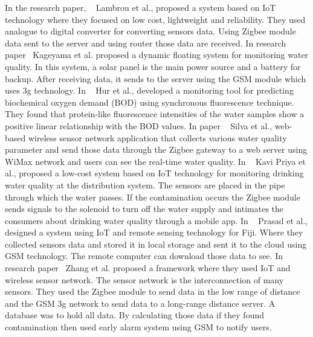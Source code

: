 In the research paper, ~\cite{lambrou2012low} Lambrou et al., proposed a system based on IoT technology where they focused on low cost, lightweight and reliability. They used analogue to digital converter for converting sensors data. Using Zigbee module data sent to the server and using router those data are received.
In research paper~\cite{kageyama2016wireless} Kageyama et al. proposed a dynamic floating system for monitoring water quality. In this system, a solar panel is the main power source and a battery for backup. After receiving data, it sends to the server using the GSM module which uses 3g technology. 
In ~\cite{hur2008using} Hur et al., developed a monitoring tool for predicting biochemical oxygen demand (BOD) using synchronous fluorescence technique. They found that protein-like fluorescence intensities of the water samples show a positive linear relationship with the BOD values.
In paper ~\cite{silva2011web} Silva et al., web-based wireless sensor network application that collects various water quality parameter and send those data through the Zigbee gateway to a web server using WiMax network and users can see the real-time water quality.
In ~\cite{priya2018design} Kavi Priya et al., proposed a low-cost system based on IoT technology for monitoring drinking water quality at the distribution system. The sensors are placed in the pipe through which the water passes. If the contamination occurs the Zigbee module sends signals to the solenoid to turn off the water supply and intimates the consumers about drinking water quality through a mobile app.
In ~\cite{prasad2015smart} Prasad et al., designed a system using IoT and remote sensing technology for Fiji. Where they collected sensors data and stored it in local storage and sent it to the cloud using GSM technology. The remote computer can download those data to see. 
In research paper~\cite{zhang2010design} Zhang et al. proposed a framework where they used IoT and wireless sensor network. The sensor network is the interconnection of many sensors. They used the Zigbee module to send data in the low range of distance and the GSM 3g network to send data to a long-range distance server. A database was to hold all data. By calculating those data if they found contamination then used early alarm system using GSM to notify users.

